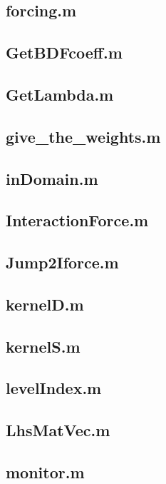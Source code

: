 \subsection{forcing.m}

\subsection{GetBDFcoeff.m}

\subsection{GetLambda.m}

\subsection{give\_the\_weights.m}

\subsection{inDomain.m}

\subsection{InteractionForce.m}

\subsection{Jump2Iforce.m}

\subsection{kernelD.m}

\subsection{kernelS.m}

\subsection{levelIndex.m}

\subsection{LhsMatVec.m}

\subsection{monitor.m}

